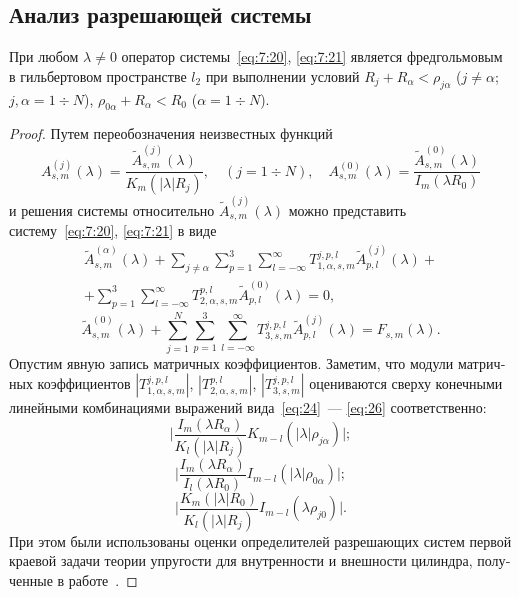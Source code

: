 \begin{russian}
\section{Анализ разрешающей системы}

\begin{theorem}
При любом $\lambda\neq 0$ оператор системы~\eqref{eq:7:20}, \eqref{eq:7:21} является фредгольмовым в гильбертовом пространстве $l_2$ при выполнении условий $R_j+R_\alpha<\rho_{j\alpha}$ ($j\neq\alpha$; $j,\alpha=1\div N$), $\rho_{0\alpha}+R_\alpha<R_0$ ($\alpha=1\div N$). 
\end{theorem}
\begin{proof}
Путем переобозначения неизвестных функций
\begin{equation}
A_{s,m}^{(j)}(\lambda)=\frac{\tilde A_{s,m}^{(j)}(\lambda)}{K_m(|\lambda|R_j)},\quad(j=1\div N),\quad A_{s,m}^{(0)}(\lambda)=\frac{\tilde A_{s,m}^{(0)}(\lambda)}{I_m(\lambda R_0)}
\end{equation}
и решения системы относительно $\tilde A_{s,m}^{(j)}(\lambda)$ можно представить систему~\eqref{eq:7:20}, \eqref{eq:7:21} в виде
\begin{multline}
\tilde A_{s,m}^{(\alpha)}(\lambda)+\sum\limits_{j\neq\alpha}\sum\limits_{p=1}^3\sum\limits_{l=-\infty}^\infty T_{1,\alpha,s,m}^{j,p,l}\tilde A_{p,l}^{(j)}(\lambda)+ \\
+ \sum\limits_{p=1}^3\sum\limits_{l=-\infty}^\infty T_{2,\alpha,s,m}^{p,l}\tilde A_{p,l}^{(0)}(\lambda)=0,
\label{eq:27}
\end{multline}
\begin{equation}
\tilde A_{s,m}^{(0)}(\lambda)+\sum\limits_{j=1}^N\sum\limits_{p=1}^3\sum\limits_{l=-\infty}^\infty T_{3,s,m}^{j,p,l}\tilde A_{p,l}^{(j)}(\lambda)=F_{s,m}(\lambda).
\label{eq:28}
\end{equation}
Опустим явную запись матричных коэффициентов. Заметим, что модули матричных коэффициентов $\left|T_{1,\alpha,s,m}^{j,p,l}\right|$, $\left|T_{2,\alpha,s,m}^{p,l}\right|$, $\left|T_{3,s,m}^{j,p,l}\right|$ оцениваются сверху конечными линейными комбинациями выражений вида~\eqref{eq:24}~--- \eqref{eq:26} соответственно:
\begin{equation}
\bigg|\frac{I_m(\lambda R_\alpha)}{K_l(|\lambda|R_j)}K_{m-l}(|\lambda|\rho_{j\alpha})\bigg|;
\label{eq:24}
\end{equation}
\begin{equation}
\bigg|\frac{I_m(\lambda R_\alpha)}{I_l(\lambda R_0)}I_{m-l}(|\lambda|\rho_{0\alpha})\bigg|;
\label{eq:25}
\end{equation}
\begin{equation}
\bigg|\frac{K_m(|\lambda|R_0)}{K_l(|\lambda|R_j)}I_{m-l}(\lambda\rho_{j0})\bigg|.
\label{eq:26}
\end{equation}
При этом были использованы оценки определителей разрешающих систем первой краевой задачи теории упругости для внутренности и внешности цилиндра, полученные в работе~\cite{Nikolaev1998}.


\end{proof}
\end{russian}
